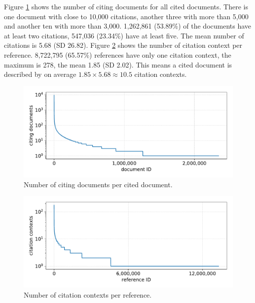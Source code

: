 Figure \ref{fig:numcitdoc} shows the number of citing documents for all cited documents. There is one document with close to 10,000 citations, another three with more than 5,000 and another ten with more than 3,000. 1,262,861 (53.89\%) of the documents have at least two citations, 547,036 (23.34\%) have at least five. The mean number of citations is 5.68 (SD 26.82). Figure \ref{fig:numcontref} shows the number of citation context per reference. 8,722,795 (65.57\%) references have only one citation context, the maximum is 278, the mean 1.85 (SD 2.02). This means a cited document is described by on average $1.85 \times 5.68 \approx 10.5$ citation contexts.

\begin{figure}
  \centering
  \includegraphics[width=\linewidth]{figures/dataset/citing_docs_per_cited_doc.pdf}
  \caption{Number of citing documents per cited document.}
  \label{fig:numcitdoc}
\end{figure}

\begin{figure}
  \centering
  \includegraphics[width=\linewidth]{figures/dataset/citation_contexts_per_reference.pdf}
  \caption{Number of citation contexts per reference.}
  \label{fig:numcontref}
\end{figure}

